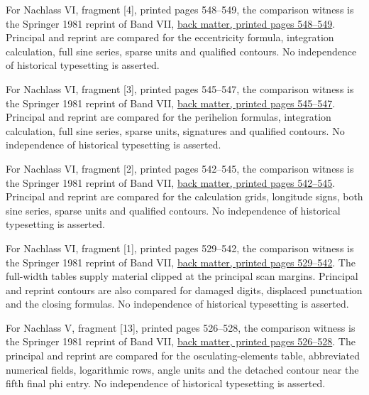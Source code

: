 For Nachlass VI, fragment [4], printed pages 548–549, the comparison witness is the Springer 1981 reprint of Band VII, \href{https://link.springer.com/content/pdf/bbm:978-3-642-92478-1/1}{back matter, printed pages 548–549}. Principal and reprint are compared for the eccentricity formula, integration calculation, full sine series, sparse units and qualified contours. No independence of historical typesetting is asserted.



For Nachlass VI, fragment [3], printed pages 545–547, the comparison witness is the Springer 1981 reprint of Band VII, \href{https://link.springer.com/content/pdf/bbm:978-3-642-92478-1/1}{back matter, printed pages 545–547}. Principal and reprint are compared for the perihelion formulas, integration calculation, full sine series, sparse units, signatures and qualified contours. No independence of historical typesetting is asserted.



For Nachlass VI, fragment [2], printed pages 542–545, the comparison witness is the Springer 1981 reprint of Band VII, \href{https://link.springer.com/content/pdf/bbm:978-3-642-92478-1/1}{back matter, printed pages 542–545}. Principal and reprint are compared for the calculation grids, longitude signs, both sine series, sparse units and qualified contours. No independence of historical typesetting is asserted.



For Nachlass VI, fragment [1], printed pages 529–542, the comparison witness is the Springer 1981 reprint of Band VII, \href{https://link.springer.com/content/pdf/bbm:978-3-642-92478-1/1}{back matter, printed pages 529–542}. The full-width tables supply material clipped at the principal scan margins. Principal and reprint contours are also compared for damaged digits, displaced punctuation and the closing formulas. No independence of historical typesetting is asserted.



For Nachlass V, fragment [13], printed pages 526–528, the comparison witness is the Springer 1981 reprint of Band VII, \href{https://link.springer.com/content/pdf/bbm:978-3-642-92478-1/1}{back matter, printed pages 526–528}. The principal and reprint are compared for the osculating-elements table, abbreviated numerical fields, logarithmic rows, angle units and the detached contour near the fifth final phi entry. No independence of historical typesetting is asserted.



